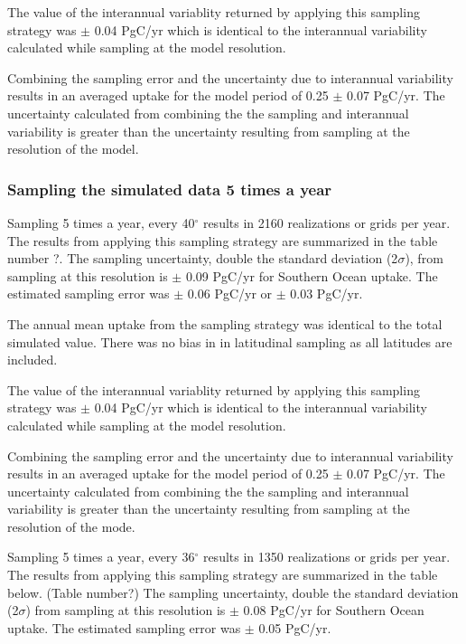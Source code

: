 \documentclass[11pt, a4paper]{article}
\numberwithin{figure}{section}
\numberwithin{table}{section}
\begin{document}
The value of the interannual variablity returned by applying this
sampling strategy was $\pm$ 0.04 PgC/yr which is identical to the 
interannual variability calculated while sampling at the model 
resolution. 

Combining the sampling error and the uncertainty due to interannual
variability results in an averaged uptake for the model period of 
0.25 $\pm$ 0.07 PgC/yr.
The uncertainty calculated from combining the the sampling and 
interannual variability is greater than the uncertainty resulting from
sampling at the resolution of the model.

\subsubsection{Sampling the simulated data 5 times a year}

Sampling 5 times a year, every 40$^{\circ}$ results in 2160 realizations 
or grids per year. The results from applying this sampling strategy are
summarized in the table number ?.
The sampling uncertainty, double the standard deviation (2$\sigma$), 
from sampling at this resolution is
$\pm$ 0.09 PgC/yr for Southern Ocean uptake.
The estimated sampling error was 
$\pm$ 0.06 PgC/yr or $\pm$ 0.03 PgC/yr.

The annual mean uptake from the sampling strategy was identical to 
the total simulated value. There was no bias in in latitudinal sampling
as all latitudes are included.

The value of the interannual variablity returned by applying this
sampling strategy was $\pm$ 0.04 PgC/yr which is identical to the 
interannual variability calculated while sampling at the model 
resolution. 

Combining the sampling error and the uncertainty due to interannual
variability results in an averaged uptake for the model period of 
0.25 $\pm$ 0.07 PgC/yr.
The uncertainty calculated from combining the the sampling and 
interannual variability is greater than the uncertainty resulting from
sampling at the resolution of the mode.


Sampling 5 times a year, every 36$^{\circ}$ results in 1350 realizations 
or grids per year. The results from applying this sampling strategy are
summarized in the table below. (Table number?)
The sampling uncertainty, double the standard deviation (2$\sigma$) 
from sampling at this resolution is
$\pm$ 0.08 PgC/yr for Southern Ocean uptake.
The estimated sampling error was 
$\pm$ 0.05 PgC/yr. %
\end{document}
